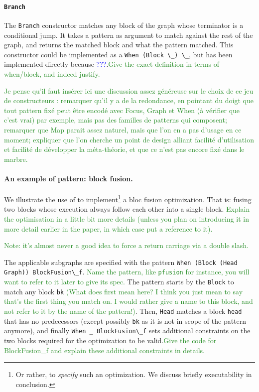 \documentclass[11pt]{article}
\newcommand{\inlinecoq}[1]{\mbox{\lstinline[style=customcoq,columns=fixed,basewidth=.48em]{#1}}}
\newcommand{\ilc}[1]{\inlinecoq{#1}}
\newcommand{\leon}[1]{\textcolor{blue}{#1}}
\newcommand{\yz}[1]{\textcolor{ForestGreen}{#1}}
\begin{document}
\paragraph{\ilc{Branch}}

The \ilc{Branch} constructor matches any block of the graph whose terminator is a conditional jump.
It takes a pattern as argument to match against the rest of the graph, and returns the matched block and what the pattern matched.
This constructor could be implemented as a \ilc{When (Block \_) \_}, but has been implemented directly because \leon{???}.\yz{Give the exact definition in terms of when/block, and indeed justify.}

\yz{Je pense qu'il faut insérer ici une discussion assez généreuse sur le choix de ce jeu de constructeurs : remarquer qu'il y a de la redondance, en pointant du doigt que tout pattern fixé peut être encodé avec Focus, Graph et When (à vérifier que c'est vrai) par exemple, mais pas des familles de patterns qui composent; remarquer que Map parait assez naturel, mais que l'on en a pas d'usage en ce moment; expliquer que l'on cherche un point de design alliant facilité d'utilisation et facilité de développer la méta-théorie, et que ce n'est pas encore fixé dans le marbre.}

\paragraph*{An example of pattern: block fusion.}
We illustrate the use of \pat{} to implement\footnote{Or rather, to \emph{specify} such an optimization. We discuss briefly executability in conclusion.} a bloc fusion optimization. 
That is: fusing two blocks whose execution always follow each other into a single block. \yz{Explain the optimisation in a little bit more details (unless you plan on introducing it in more detail earlier in the paper, in which case put a reference to it).}

\yz{Note: it's almost never a good idea to force a return carriage via a double slash.}

The applicable subgraphs are specified with the pattern \ilc{When (Block (Head Graph)) BlockFusion\_f}. \yz{Name the pattern, like \ilc{pfusion} for instance, you will want to refer to it later to give its spec.}
The pattern starts by the \ilc{Block} to match any block \ilc{bk} \yz{(What does first mean here? I think you just mean to say that's the first thing you match on. I would rather give a name to this block, and not refer to it by the name of the pattern!)}. Then, \ilc{Head} matches a block \ilc{head} that has no predecessors (except possibly \ilc{bk} as it is not in scope of the pattern anymore), and finally \ilc{When _ BlockFusion\_f} sets additional constraints on the two blocks required for the optimization to be valid.\yz{Give the code for BlockFusion\_f and explain these additional constraints in details.}
\end{document}
